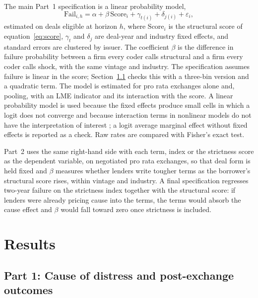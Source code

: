 \documentclass[12pt]{article}
\begin{document}
The main Part~1 specification is a linear probability model,
\begin{equation}
  \text{Fail}_{i,h} = \alpha + \beta\,\text{Score}_i + \gamma_{t(i)} + \delta_{j(i)} + \varepsilon_i ,
  \label{eq:main}
\end{equation}
estimated on deals eligible at horizon $h$, where $\text{Score}_i$ is the structural score of equation~\eqref{eq:score}, $\gamma_t$ and $\delta_j$ are deal-year and industry fixed effects, and standard errors are clustered by issuer. The coefficient $\beta$ is the difference in failure probability between a firm every coder calls structural and a firm every coder calls shock, with the same vintage and industry. The specification assumes failure is linear in the score; Section~\ref{sec:p1} checks this with a three-bin version and a quadratic term. The model is estimated for pro rata exchanges alone and, pooling, with an LME indicator and its interaction with the score. A linear probability model is used because the fixed effects produce small cells in which a logit does not converge and because interaction terms in nonlinear models do not have the interpretation of interest \citep{aiNorton2003}; a logit average marginal effect without fixed effects is reported as a check. Raw rates are compared with Fisher's exact test.

Part~2 uses the same right-hand side with each term, index or the strictness score as the dependent variable, on negotiated pro rata exchanges, so that deal form is held fixed and $\beta$ measures whether lenders write tougher terms as the borrower's structural score rises, within vintage and industry. A final specification regresses two-year failure on the strictness index together with the structural score: if lenders were already pricing cause into the terms, the terms would absorb the cause effect and $\beta$ would fall toward zero once strictness is included.

\section{Results}

\subsection{Part 1: Cause of distress and post-exchange outcomes}
\label{sec:p1}
\end{document}
